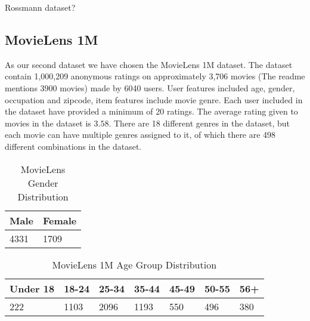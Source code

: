 Rossmann dataset?

\subsection{MovieLens 1M}

As our second dataset we have chosen the MovieLens 1M dataset. The dataset contain 1,000,209 anonymous ratings on approximately 3,706 movies (The readme mentions 3900 movies) made by 6040 users. User features included age, gender, occupation and zipcode, item features include movie genre. Each user included in the dataset have provided a minimum of 20 ratings. The average rating given to movies in the dataset is $3.58$. There are 18 different genres in the dataset, but each movie can have multiple genres assigned to it, of which there are 498 different combinations in the dataset.

\begin{table}[H]
\centering
\begin{tabular}{|l|l|}
\hline
Male & Female \\ \hline
4331 & 1709 \\ \hline
\end{tabular}
\caption{MovieLens Gender Distribution}
\end{table}

\begin{table}[H]
\centering
\begin{tabular}{|l|l|l|l|l|l|l|}
\hline
Under 18 & 18-24 & 25-34 	& 35-44 	& 45-49 & 50-55 & 56+ \\ \hline
222		 &	1103 &	2096	&	1193	& 550	& 496	& 380 \\ \hline
\end{tabular}
\caption{MovieLens 1M Age Group Distribution}
\end{table}

